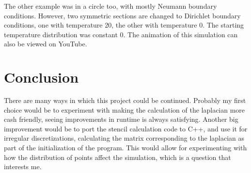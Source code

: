 \documentclass[pdftex,12pt,a4paper]{article}
\begin{document}
		The other example was in a circle too, with mostly Neumann boundary conditions. However, two symmetric sections are changed to Dirichlet boundary conditions, one with temperature 20, the other with temperature 0. The starting temperature distribution was constant 0. The animation of this simulation can also be viewed on YouTube. \cite{conduction}
	\section{Conclusion}
		There are many ways in which this project could be continued. Probably my first choice would be to experiment with making the calculation of the laplacian more cash friendly, seeing improvements in runtime is always satisfying. Another big improvement would be to port the stencil calculation code to C++, and use it for irregular discretizations, calculating the matrix corresponding to the laplacian as part of the initialization of the program. This would allow for experimenting with how the distribution of points affect the simulation, which is a question that interests me.
	
    
\end{document}
